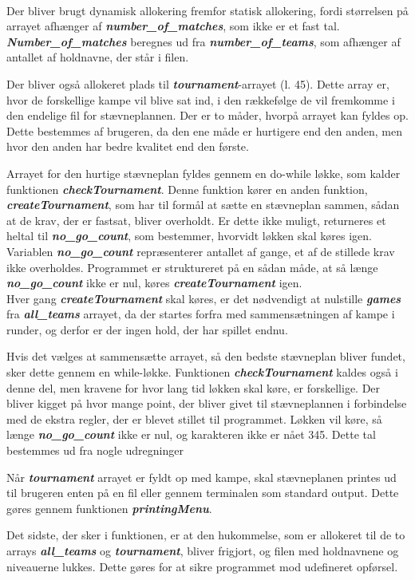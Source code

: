 \\
Der bliver brugt dynamisk allokering fremfor statisk allokering, fordi størrelsen på arrayet afhænger af \textbf{\textit{number\_of\_matches}}, som ikke er et fast tal. \textbf{\textit{Number\_of\_matches}} beregnes ud fra \textbf{\textit{number\_of\_teams}}, som afhænger af antallet af holdnavne, der står i filen. 
\par
Der bliver også allokeret plads til \textbf{\textit{tournament}}-arrayet (l. 45). Dette array er, hvor de forskellige kampe vil blive sat ind, i den rækkefølge de vil fremkomme i den endelige fil for stævneplannen. Der er to måder, hvorpå arrayet kan fyldes op. Dette bestemmes af brugeren, da den ene måde er hurtigere end den anden, men hvor den anden har bedre kvalitet end den første. 
\par
Arrayet for den hurtige stævneplan fyldes gennem en do-while løkke, som kalder funktionen \textbf{\textit{checkTournament}}. Denne funktion kører en anden funktion, \textbf{\textit{createTournament}}, som har til formål at sætte en stævneplan sammen, sådan at de krav, der er fastsat, bliver overholdt. Er dette ikke muligt, returneres et heltal til \textbf{\textit{no\_go\_count}}, som bestemmer, hvorvidt løkken skal køres igen.
\\
Variablen \textbf{\textit{no\_go\_count}} repræsenterer antallet af gange, et af de stillede krav ikke overholdes. Programmet er struktureret på en sådan måde, at så længe \textbf{\textit{no\_go\_count}} ikke er nul, køres \textbf{\textit{createTournament}} igen.
\\
Hver gang \textbf{\textit{createTournament}} skal køres, er det nødvendigt at nulstille \textbf{\textit{games}} fra \textbf{\textit{all\_teams}} arrayet, da der startes forfra med sammensætningen af kampe i runder, og derfor er der ingen hold, der har spillet endnu.
\par
Hvis det vælges at sammensætte arrayet, så den bedste stævneplan bliver fundet, sker dette gennem en while-løkke. Funktionen \textbf{\textit{checkTournament}} kaldes også i denne del, men kravene for hvor lang tid løkken skal køre, er forskellige. Der bliver kigget på hvor mange point, der bliver givet til stævneplannen i forbindelse med de ekstra regler, der er blevet stillet til programmet. Løkken vil køre, så længe \textbf{\textit{no\_go\_count}} ikke er nul, og karakteren ikke er nået 345. Dette tal bestemmes ud fra nogle udregninger
\par
Når \textbf{\textit{tournament}} arrayet er fyldt op med kampe, skal stævneplanen printes ud til brugeren enten på en fil eller gennem terminalen som standard output. Dette gøres gennem funktionen \textbf{\textit{printingMenu}}.
\par
Det sidste, der sker i funktionen, er at den hukommelse, som er allokeret til de to arrays \textbf{\textit{all\_teams}} og \textbf{\textit{tournament}}, bliver frigjort, og filen med holdnavnene og niveauerne lukkes. Dette gøres for at sikre programmet mod udefineret opførsel.

